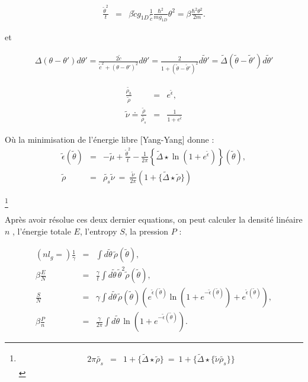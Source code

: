 \begin{eqnarray*}
	\frac{\tilde{\theta}^2}{t}	 & = & \beta \tilde{c} g_{1D} \frac{1}{\tilde{c}} \frac{\hbar^2}{m g_{1D}} \theta^2 = \beta \frac{ \hbar^2 \theta^2}{2 m}.
\end{eqnarray*}

et 

\begin{eqnarray*}
	\Delta ( \theta - \theta' ) d\theta' = \frac{2 \tilde{c}}{ \tilde{c}^2 + ( \theta - \theta')^2 } d \theta' = \frac{2}{ 1 + ( \tilde{\theta} - \tilde{\theta}')^2 } d\tilde{\theta}' = \tilde{\Delta} ( \tilde{\theta} - \tilde{\theta}') d \tilde{\theta}' 	
\end{eqnarray*}

\begin{eqnarray}
	\frac{\tilde{\rho_h}}{\tilde{\rho}} & = & e^{\tilde{\epsilon} }, \\
	\tilde{\nu} \doteq \frac{\tilde{\rho}}{\tilde{\rho_s}} & = & \frac{1}{1+ e ^{\tilde{\epsilon}} }	
\end{eqnarray}

Où la minimisation de l'énergie libre [Yang-Yang] donne :
\begin{eqnarray}
	\tilde{\epsilon} ( \tilde{\theta} ) & = & - \tilde{\mu} + \frac{\tilde{\theta}^2 }{t} - \frac{1}{2 \pi} \left \{\tilde{\Delta} \star \ln \left ( 1 + e^{\tilde{\epsilon}} \right )  \right \} ( \tilde{\theta} ), \label{eq:1Bess}\\
	\tilde{\rho} &=& \tilde{\rho_s} \tilde{\nu}   ~=~   \frac{\tilde{\nu}}{2 \pi}  ( 1 + \{ \tilde{\Delta} \star \tilde{\rho} \} ) 	 \label{eq:2Bess}
\end{eqnarray}

\footnote{\begin{eqnarray} 2\pi \tilde{\rho_s}  & =  &  1 + \{ \tilde{\Delta} \star \tilde{\rho} \} ~= ~ 1 + \{ \tilde{\Delta} \star \{\tilde{\nu} \tilde{\rho_s}\} \}  \label{eq:3Bess}\end{eqnarray}}

Après avoir résolue ces deux dernier equations, on peut calculer la densité linéaire $n$ , l'énergie totale $E$, l'entropy $S$, la pression $P$ : 

\begin{eqnarray}\label{eq:5Bess}
	(nl_g = ) \frac{1}{\gamma} & = & \int d \tilde{\theta} \,\tilde{\rho}(\tilde{\theta}), \\
	\beta \frac{E}{N} & = & \frac{\gamma}{t} \int d \tilde{\theta}\,  \tilde{\theta}^2 \tilde{\rho}(\tilde{\theta}), \\
	\frac{S}{N} & = & \gamma 	\int d \tilde{\theta} \,\tilde{\rho}(\tilde{\theta}) \left ( e^{\tilde{\epsilon}(\tilde{\theta})} \ln \left ( 1 + e^{-\tilde{\epsilon}(\tilde{\theta})}  \right ) + e^{\tilde{\epsilon}(\tilde{\theta})} \right )  ,\\
	\beta \frac{P}{n}  & = & \frac{\gamma}{2 \pi} \int d \tilde{\theta} \, \ln \left ( 1 + e^{-\tilde{\epsilon}(\tilde{\theta})}  \right ).
\end{eqnarray}


